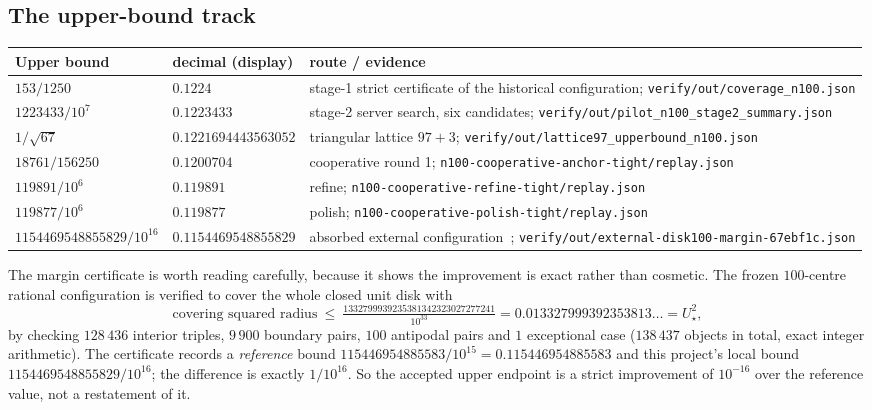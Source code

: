 \subsection{The upper-bound track}

\begin{center}
\footnotesize
\begin{tabular}{@{}>{\raggedright\arraybackslash}p{}>{\raggedright\arraybackslash}p{}>{\raggedright\arraybackslash}p{}@{}}
\toprule
Upper bound & decimal (display) & route / evidence \\
\midrule
$153/1250$ & $0.1224$ & stage-1 strict certificate of the historical configuration;
\texttt{verify/\allowbreak{}out/\allowbreak{}coverage\_\allowbreak{}n100.json} \\
$1223433/10^{7}$ & $0.1223433$ & stage-2 server search, six candidates;
\texttt{verify/\allowbreak{}out/\allowbreak{}pilot\_\allowbreak{}n100\_\allowbreak{}stage2\_\allowbreak{}summary.json} \\
$1/\sqrt{67}$ & $0.1221694443563052$ & triangular lattice $97{+}3$;
\texttt{verify/\allowbreak{}out/\allowbreak{}lattice97\_\allowbreak{}upperbound\_\allowbreak{}n100.json} \\
$18761/156250$ & $0.1200704$ & cooperative round 1;
\texttt{n100-\allowbreak{}cooperative-\allowbreak{}anchor-\allowbreak{}tight/\allowbreak{}replay.json} \\
$119891/10^{6}$ & $0.119891$ & refine; \texttt{n100-\allowbreak{}cooperative-\allowbreak{}refine-\allowbreak{}tight/\allowbreak{}replay.json} \\
$119877/10^{6}$ & $0.119877$ & polish; \texttt{n100-\allowbreak{}cooperative-\allowbreak{}polish-\allowbreak{}tight/\allowbreak{}replay.json} \\
$1154469548855829/10^{16}$ & $\mathbf{0.1154469548855829}$ & absorbed external configuration~\cite{external67ebf1c};
\texttt{verify/\allowbreak{}out/\allowbreak{}external-\allowbreak{}disk100-\allowbreak{}margin-\allowbreak{}67ebf1c.\allowbreak{}json} \\
\bottomrule
\end{tabular}
\end{center}

The margin certificate is worth reading carefully, because it shows the improvement is exact rather
than cosmetic. The frozen $100$-centre rational configuration is verified to cover the whole closed
unit disk with
\[
\text{covering squared radius}\ \le\
\tfrac{1332799939235381342323027277241}{10^{33}}
=0.013327999392353813\ldots=U_\star^2 ,
\]
by checking $128\,436$ interior triples, $9\,900$ boundary pairs, $100$ antipodal pairs and $1$
exceptional case ($138\,437$ objects in total, exact integer arithmetic). The certificate records a
\emph{reference} bound $115446954885583/10^{15}=0.115446954885583$ and this project's local bound
$1154469548855829/10^{16}$; the difference is exactly $1/10^{16}$. So the accepted upper endpoint is
a strict improvement of $10^{-16}$ over the reference value, not a restatement of it.

